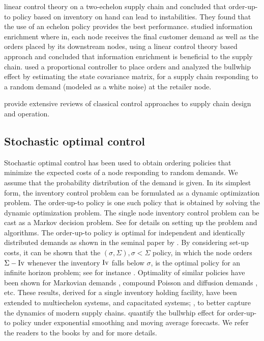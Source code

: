 linear control theory on a two-echelon supply chain and concluded that
order-up-to policy based on inventory on hand can lead to
instabilities. They found that the use of an echelon policy
provides the best
performance. \citet{dejonckheere:disney:lambrecht:towill:2004} studied
information enrichment where in, each node receives the final customer
demand as well as the orders placed by its downstream nodes, using a
linear control theory based approach and concluded that information
enrichment is beneficial to the supply
chain. \citet{papanagnou:halikias:2008}  used a proportional
controller to place orders and analyzed the bullwhip effect by
estimating the state covariance matrix, for a supply chain responding
to a random demand (modeled as a white noise) at the retailer node.


\citet{sarimevis:patrinos:tarantilis:kiranoudis:2008,ortega:lin:2004}
provide extensive reviews of classical control approaches to supply
chain design and operation.

\subsection*{Stochastic optimal control}
Stochastic optimal control has been used to obtain ordering policies
that minimize the expected costs of a node responding to random
demands. We assume that the probability distribution of the demand is given.
 In its simplest form, the inventory control problem can be formulated
 as a dynamic optimization problem. The order-up-to policy is one such
 policy that is obtained by solving the dynamic optimization
 problem. The single node inventory control problem can be cast as a
 Markov decision problem. See \citet{puterman:2005} for details on
 setting up the problem and algorithms. 
The order-up-to policy is optimal for independent and identically
distributed demands as shown in the seminal paper by
\citet{clark:scarf:1960}. 
 By considering set-up costs, it can be shown that the $(\sigma,\Sigma),\sigma<\Sigma$
 policy, in which the node orders $\Sigma-\textrm{Iv}$ whenever the inventory
 $\textrm{Iv}$ falls below $\sigma$, is the optimal policy for an infinite horizon
 problem; see for instance
 \citep{veinott:1966,iglehart:1963,federgruen:zipkin:1984}. Optimality
 of similar policies have been shown for Markovian demands
 \citep{song:zipkin:1993,sethi:cheng:1997}, compound Poisson and
 diffusion demands \citep{bensoussan:liu:sethi:2006}, etc. 
 These results, derived for a single inventory holding
facility, have been extended to multiechelon systems,
\citep{federgruen:1993, shang:song:2003, dong:lee:2003,
  gallego:ozer:2005,chen:song:2001}and  capacitated
systems;
\citep{levi:roundy:shmoys:truong:2008,federgruen:zipkin:1986,federgruen:zipkin:1986b},
to better capture the dynamics of modern supply
chains. \citet{chen:ryan:simchi-levi:2000,chen:ryan:simchi-levi:2000b}
quantify the bullwhip effect for order-up-to policy under exponential
smoothing and moving average forecasts. We refer the readers to the
books by \citet{zipkin:2000} and \citet{axsater:2006} for more
details. 


